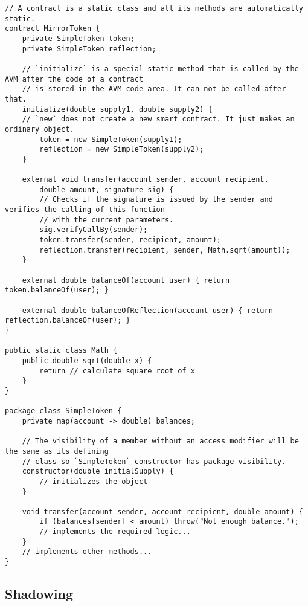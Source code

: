 \documentclass[11pt, a4paper]{report}
\begin{document}
    \begin{lstlisting}[frame=TB, float, title=Argon contracts are static classes,label={lst:code1}]
// A contract is a static class and all its methods are automatically static.
contract MirrorToken {
    private SimpleToken token;
    private SimpleToken reflection;

    // `initialize` is a special static method that is called by the AVM after the code of a contract
    // is stored in the AVM code area. It can not be called after that.
    initialize(double supply1, double supply2) {
    // `new` does not create a new smart contract. It just makes an ordinary object.
        token = new SimpleToken(supply1);
        reflection = new SimpleToken(supply2);
    }

    external void transfer(account sender, account recipient,
        double amount, signature sig) {
        // Checks if the signature is issued by the sender and verifies the calling of this function
        // with the current parameters.
        sig.verifyCallBy(sender);
        token.transfer(sender, recipient, amount);
        reflection.transfer(recipient, sender, Math.sqrt(amount));
    }

    external double balanceOf(account user) { return token.balanceOf(user); }

    external double balanceOfReflection(account user) { return reflection.balanceOf(user); }
}

public static class Math {
    public double sqrt(double x) {
        return // calculate square root of x
    }
}

package class SimpleToken {
    private map(account -> double) balances;

    // The visibility of a member without an access modifier will be the same as its defining
    // class so `SimpleToken` constructor has package visibility.
    constructor(double initialSupply) {
        // initializes the object
    }

    void transfer(account sender, account recipient, double amount) {
        if (balances[sender] < amount) throw("Not enough balance.");
        // implements the required logic...
    }
    // implements other methods...
}
    \end{lstlisting}

    \subsection{Shadowing}\label{subsec:shadowing}
\end{document}
